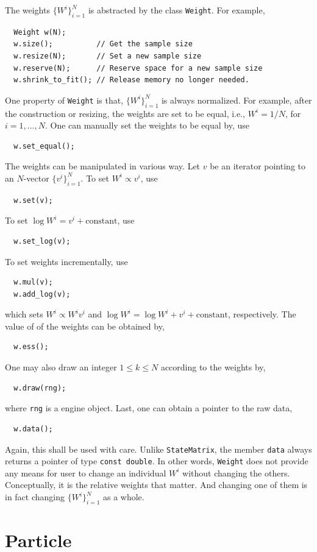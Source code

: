The weights $\{W^i\}_{i=1}^N$ is abstracted by the class \verb|Weight|. For
example,
\begin{Verbatim}
  Weight w(N);
  w.size();          // Get the sample size
  w.resize(N);       // Set a new sample size
  w.reserve(N);      // Reserve space for a new sample size
  w.shrink_to_fit(); // Release memory no longer needed.
\end{Verbatim}
One property of \verb|Weight| is that, $\{W^i\}_{i=1}^N$ is always normalized.
For example, after the construction or resizing, the weights are set to be
equal, i.e., $W^i = 1 / N$, for $i = 1,\dots,N$. One can manually set the
weights to be equal by, use
\begin{Verbatim}
  w.set_equal();
\end{Verbatim}
The weights can be manipulated in various way. Let $v$ be an iterator pointing
to an $N$-vector $\{v^i\}_{i=1}^N$. To set $W^i \propto v^i$, use
\begin{Verbatim}
  w.set(v);
\end{Verbatim}
To set $\log W^i = v^i + \mathrm{constant}$, use
\begin{Verbatim}
  w.set_log(v);
\end{Verbatim}
To set weights incrementally, use
\begin{Verbatim}
  w.mul(v);
  w.add_log(v);
\end{Verbatim}
which sets $W^i \propto W^i v^i$ and $\log W^i = \log W^i + v^i +
\mathrm{constant}$, respectively. The value of \ess of the weights can be
obtained by,
\begin{Verbatim}
  w.ess();
\end{Verbatim}
One may also draw an integer $1 \le k \le N$ according to the weights by,
\begin{Verbatim}
  w.draw(rng);
\end{Verbatim}
where \verb|rng| is a \cppoo{} \rng engine object. Last, one can obtain a
pointer to the raw data,
\begin{Verbatim}
  w.data();
\end{Verbatim}
Again, this shall be used with care. Unlike \verb|StateMatrix|, the member
\verb|data| always returns a pointer of type \verb|const double|. In other
words, \verb|Weight| does not provide any means for user to change an
individual $W^i$ without changing the others. Conceptually, it is the relative
weights that matter. And changing one of them is in fact changing
$\{W^i\}_{i=1}^N$ as a whole.

\section{Particle}
\label{sec:Particle}

